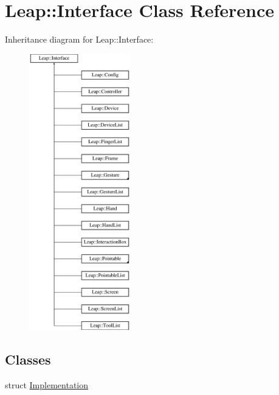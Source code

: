 \hypertarget{class_leap_1_1_interface}{\section{Leap\+:\+:Interface Class Reference}
\label{class_leap_1_1_interface}
}
Inheritance diagram for Leap\+:\+:Interface\+:\begin{figure}[H]
\begin{center}
\leavevmode
\includegraphics[height=12.000000cm]{class_leap_1_1_interface}
\end{center}
\end{figure}
\subsection*{Classes}
\begin{DoxyCompactItemize}
\item 
struct \hyperlink{struct_leap_1_1_interface_1_1_implementation}{Implementation}
\end{DoxyCompactItemize}
